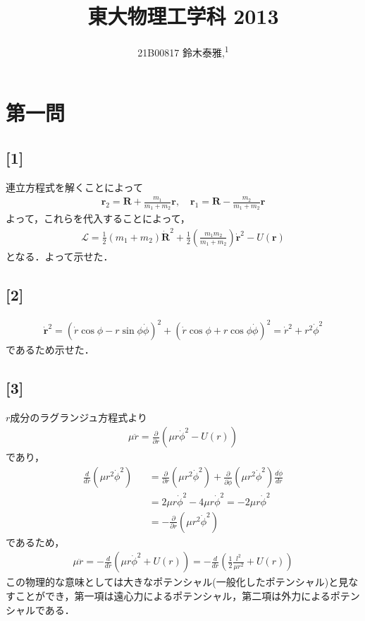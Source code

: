 \documentclass[12pt,dvipdfmx]{jsarticle}
\newcommand\authormark[1]{\textsuperscript{#1}}
\begin{document}
\title{東大物理工学科 2013}

\author{21B00817 鈴木泰雅,\authormark{1}}
\section*{\Large{第一問}}
\subsection*{\large{[1]}}
連立方程式を解くことによって
\begin{eqnarray}
  \bm{r}_2 = \bm{R} + \frac{m_1}{m_1+m_2}\bm{r}, \quad \bm{r}_1 = \bm{R} - \frac{m_2}{m_1+m_2}\bm{r}
\end{eqnarray}
よって，これらを代入することによって，
\begin{eqnarray}
  \mathcal{L} = \frac{1}{2}(m_1+m_2)\dot{\bm{R}}^2 + \frac{1}{2}\left( \frac{m_1m_2}{m_1+m_2} \right)\bm{\dot{r}}^2 - U(\bm{r})
\end{eqnarray}
となる．よって示せた．
\subsection*{\large{[2]}}
\begin{eqnarray}
  \bm{\dot{r}}^2= \left( \dot{r}\cos\phi - r\sin\phi\dot{\phi} \right)^2 + \left( \dot{r}\cos\phi +r\cos\phi\dot{\phi} \right)^2 = \dot{r}^2 + r^2\dot{\phi}^2
\end{eqnarray}
であるため示せた．
\subsection*{\large{[3]}}
$r$成分のラグランジュ方程式より 
\begin{eqnarray}
  \mu \ddot{r} = \frac{\partial}{\partial r} \left( \mu r \dot{\phi}^2 -U(r) \right)
\end{eqnarray}
であり，
\begin{eqnarray}
  \frac{d}{dr}\left( \mu r^2\dot{\phi}^2 \right) &&= \frac{\partial}{\partial r}\left(\mu r^2\dot{\phi}^2\right) + \frac{\partial}{\partial \dot{\phi}}\left(\mu r^2\dot{\phi}^2\right) \frac{d\dot{\phi}}{dr}\\
  &&= 2\mu r \dot{\phi}^2 - 4 \mu r \dot{\phi}^2 = - 2\mu r \dot{\phi}^2\\
  &&= - \frac{\partial}{\partial r}\left(\mu r^2\dot{\phi}^2\right)
\end{eqnarray}
であるため，
\begin{eqnarray}
  \mu \ddot{r} = -\frac{d}{d r} \left( \mu r \dot{\phi}^2 +U(r) \right) =  -\frac{d}{d r} \left( \frac{1}{2}\frac{l^2}{\mu r^2} +U(r) \right) 
\end{eqnarray}
この物理的な意味としては大きなポテンシャル(一般化したポテンシャル)と見なすことができ，第一項は遠心力によるポテンシャル，第二項は外力によるポテンシャルである．
\end{document}
